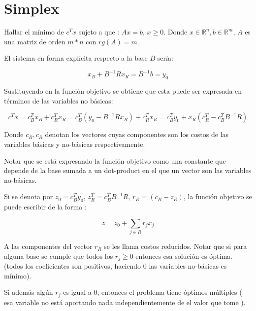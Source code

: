 \documentclass[14pt]{extarticle}
\begin{document}
\section{Simplex}

Hallar el mínimo de $c^T x$ sujeto a que : $Ax = b$, $x \geq 0$. Donde $x \in \mathbb{R}^n, b \in \mathbb{R}^m$, $A$ es una matriz de orden $m * n$ con $rg(A) = m$. 

El sistema en forma explícita respecto a la base $B$ sería:

$$x_B + B^{-1}Rx_R = B^{-1}b = y_0$$

Sustituyendo en la función objetivo se obtiene que esta puede ser expresada en términos de las variables no básicas:

$$c^Tx = c^T_Bx_B + c^T_Rx_R = c^T_B(y_0 - B^{-1}Rx_R) + c^T_Rx_R = c^T_By_0 + x_R(c^T_R - c^T_BB^{-1}R)$$

Donde $c_B, c_R$ denotan los vectores cuyas componentes son los costos de las variables básicas y no-básicas respectivamente.

Notar que se está expresando la función objetivo como una constante que depende de la base sumada a un dot-product en el que un vector son las variables no-básicas.

Si se denota por $z_0 = c^T_By_0$, $z^T_R = c^T_BB^{-1}R$, $r_R = (c_R - z_R)$, la función objetivo se puede escribir de la forma :

$$z = z_0 + \sum_{j \in R} r_j x_j$$

A las componentes del vector $r_R$ se les llama costos reducidos. Notar que si para alguna base se cumple que todos los $r_j \geq 0$ entonces esa solución es óptima. (todos los coeficientes son positivos, haciendo $0$ las variables no-básicas es mínimo).

Si además algún $r_j$ es igual a $0$, entonces el problema tiene óptimos múltiples ( esa variable no está aportando nada independientemente de el valor que tome ).
\end{document}
